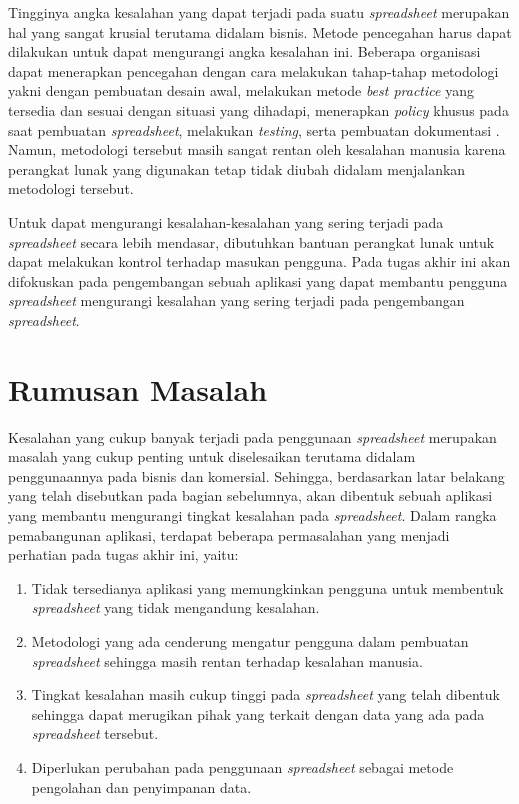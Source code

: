 Tingginya angka kesalahan yang dapat terjadi pada suatu \textit{spreadsheet} merupakan hal yang sangat krusial terutama didalam bisnis. Metode pencegahan harus dapat dilakukan untuk dapat mengurangi angka kesalahan ini. Beberapa organisasi dapat menerapkan pencegahan dengan cara melakukan tahap-tahap metodologi yakni dengan pembuatan desain awal, melakukan metode \textit{best practice} yang tersedia dan sesuai dengan situasi yang dihadapi, menerapkan \textit{policy} khusus pada saat pembuatan \textit{spreadsheet}, melakukan \textit{testing}, serta pembuatan dokumentasi \parencite{EUSPRIGBestPractice}. Namun, metodologi tersebut masih sangat rentan oleh kesalahan manusia karena perangkat lunak yang digunakan tetap tidak diubah didalam menjalankan metodologi tersebut. 

Untuk dapat mengurangi kesalahan-kesalahan yang sering terjadi pada \textit{spreadsheet} secara lebih mendasar, dibutuhkan bantuan perangkat lunak untuk dapat melakukan kontrol terhadap masukan pengguna. Pada tugas akhir ini akan difokuskan pada pengembangan sebuah aplikasi yang dapat membantu pengguna \textit{spreadsheet} mengurangi kesalahan yang sering terjadi pada pengembangan \textit{spreadsheet}.

\section{Rumusan Masalah}

Kesalahan yang cukup banyak terjadi pada penggunaan \textit{spreadsheet} merupakan masalah yang cukup penting untuk diselesaikan terutama didalam penggunaannya pada bisnis dan komersial. Sehingga, berdasarkan latar belakang yang telah disebutkan pada bagian sebelumnya, akan dibentuk sebuah aplikasi yang membantu mengurangi tingkat kesalahan pada \textit{spreadsheet}. Dalam rangka pemabangunan aplikasi, terdapat beberapa permasalahan yang menjadi perhatian pada tugas akhir ini, yaitu:

\begin{enumerate}
    \item Tidak tersedianya aplikasi yang memungkinkan pengguna untuk membentuk \textit{spreadsheet} yang tidak mengandung kesalahan.
    \item Metodologi yang ada cenderung mengatur pengguna dalam pembuatan \textit{spreadsheet} sehingga masih rentan terhadap kesalahan manusia.
    \item Tingkat kesalahan masih cukup tinggi pada \textit{spreadsheet} yang telah dibentuk sehingga dapat merugikan pihak yang terkait dengan data yang ada pada \textit{spreadsheet} tersebut.
    \item Diperlukan perubahan pada penggunaan \textit{spreadsheet} sebagai metode pengolahan dan penyimpanan data.
\end{enumerate}

